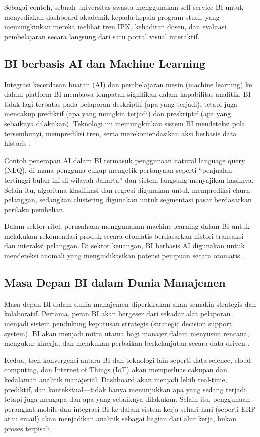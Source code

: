 Sebagai contoh, sebuah universitas swasta menggunakan self-service BI untuk menyediakan dashboard akademik kepada kepala program studi, yang memungkinkan mereka melihat tren IPK, kehadiran dosen, dan evaluasi pembelajaran secara langsung dari satu portal visual interaktif.

\subsection{BI berbasis AI dan Machine Learning}

Integrasi kecerdasan buatan (AI) dan pembelajaran mesin (machine learning) ke dalam platform BI membawa lompatan signifikan dalam kapabilitas analitik. BI tidak lagi terbatas pada pelaporan deskriptif (apa yang terjadi), tetapi juga mencakup prediktif (apa yang mungkin terjadi) dan preskriptif (apa yang sebaiknya dilakukan). Teknologi ini memungkinkan sistem BI mendeteksi pola tersembunyi, memprediksi tren, serta merekomendasikan aksi berbasis data historis \cite{chen2021aibi}.

Contoh penerapan AI dalam BI termasuk penggunaan natural language query (NLQ), di mana pengguna cukup mengetik pertanyaan seperti “penjualan tertinggi bulan ini di wilayah Jakarta” dan sistem langsung menyajikan hasilnya. Selain itu, algoritma klasifikasi dan regresi digunakan untuk memprediksi churn pelanggan, sedangkan clustering digunakan untuk segmentasi pasar berdasarkan perilaku pembelian.

Dalam sektor ritel, perusahaan menggunakan machine learning dalam BI untuk melakukan rekomendasi produk secara otomatis berdasarkan histori transaksi dan interaksi pelanggan. Di sektor keuangan, BI berbasis AI digunakan untuk mendeteksi anomali yang mengindikasikan potensi penipuan secara otomatis.

\subsection{Masa Depan BI dalam Dunia Manajemen}

Masa depan BI dalam dunia manajemen diperkirakan akan semakin strategis dan kolaboratif. Pertama, peran BI akan bergeser dari sekadar alat pelaporan menjadi sistem pendukung keputusan strategis (strategic decision support system). BI akan menjadi mitra utama bagi manajer dalam menyusun rencana, mengukur kinerja, dan melakukan perbaikan berkelanjutan secara data-driven \cite{gantz2020futurebi}.

Kedua, tren konvergensi antara BI dan teknologi lain seperti data science, cloud computing, dan Internet of Things (IoT) akan memperluas cakupan dan kedalaman analitik manajerial. Dashboard akan menjadi lebih real-time, prediktif, dan kontekstual—tidak hanya menunjukkan apa yang sedang terjadi, tetapi juga mengapa dan apa yang sebaiknya dilakukan. Selain itu, penggunaan perangkat mobile dan integrasi BI ke dalam sistem kerja sehari-hari (seperti ERP atau email) akan menjadikan analitik sebagai bagian dari alur kerja, bukan proses terpisah.

